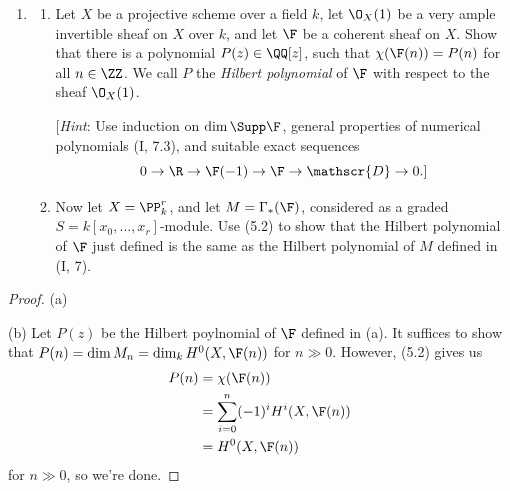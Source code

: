 \documentclass[12pt]{amsart}
\begin{document}
\begin{enumerate}
  \item[5.2.] {
      \begin{enumerate}
        \item Let $X$ be a projective scheme over a field $k$, let $\O_X(1)$ be a very ample invertible sheaf on $X$ over $k$, and let $\F$ be a coherent sheaf on $X$.
          Show that there is a polynomial $P(z)\in \QQ[z]$, such that $\chi(\F(n))=P(n)$ for all $n\in \ZZ$.
          We call $P$ the \emph{Hilbert polynomial} of $\F$ with respect to the sheaf $\O_X(1)$.

          [\emph{Hint}: Use induction on $\dim \Supp \F$, general properties of numerical polynomials (I, 7.3), and suitable exact sequences
          \[
            0\to\R\to \F(-1)\to \F\to \mathscr{D}\to 0.]
          \] 
        \item Now let $X=\PP^r_k$, and let $M=\Gamma_*(\F)$, considered as a graded $S=k[x_0,\ldots,x_r]$-module.
          Use (5.2) to show that the Hilbert polynomial of $\F$ just defined is the same as the Hilbert polynomial of $M$ defined in (I, 7).
      \end{enumerate}
    }
\end{enumerate}

\begin{proof}
  (a)

  (b) Let $P(z)$ be the Hilbert poylnomial of $\F$ defined in (a).
  It suffices to show that $P(n)=\dim M_n =\dim_k H^0(X,\F(n))$ for $n\gg 0$.
  However, (5.2) gives us
  \begin{align*}
    P(n)
    &=\chi(\F(n)) \\
    &=\sum_{i=0}^n (-1)^iH^i(X,\F(n)) \\
    &=H^0(X,\F(n))
  \end{align*}
  for $n\gg 0$, so we're done.
\end{proof}
\end{document}
